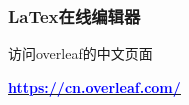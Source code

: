 \begin{frame}[fragile,t]
\frametitle{LaTex在线编辑器}
\vspace*{1cm}
\large
访问overleaf的中文页面 \\
\vspace*{3cm}

\centering
\underline{\Huge \textbf{\href{https://cn.overleaf.com/}{\textcolor{blue}{https://cn.overleaf.com/}}}}\\

\end{frame}